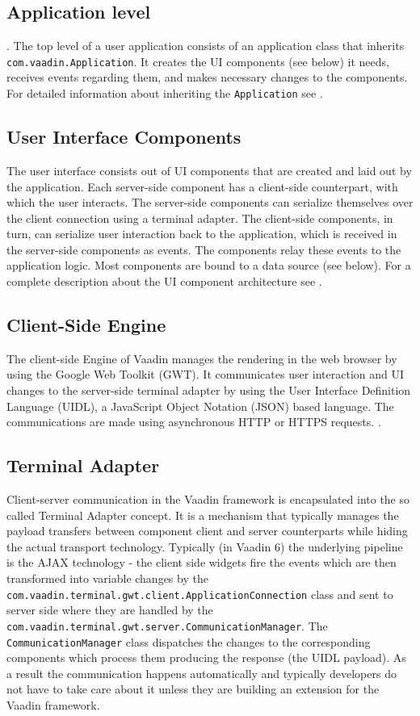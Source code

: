 \subsection{Application level}.
The top level of a user application consists of an
application class that inherits \texttt{com.vaadin.Application}. It creates the
UI components (see below) it needs, receives events regarding them, and makes
necessary changes to the components.
For detailed information about inheriting the \texttt{Application} see \cite{BoV}.

\subsection{User Interface Components}
The user interface consists out of UI
components that are created and laid out by the application.
Each server-side component has a client-side counterpart, with which the user
interacts. The server-side components can serialize themselves over the client
connection using a terminal adapter. The client-side components, in turn, can
serialize user interaction back to the application, which is received in the
server-side components as events. The components relay these events to the
application logic. Most components are bound to a data source (see below). For a
complete description about the UI component architecture see \cite{BoV}.

\subsection{Client-Side Engine} The client-side Engine of Vaadin manages the
rendering in the web browser by using the Google Web Toolkit (GWT). It
communicates user interaction and UI changes to the server-side terminal adapter
by using the User Interface Definition Language (UIDL), a JavaScript Object
Notation (JSON) based language. The communications are made using asynchronous
HTTP or HTTPS requests.
\cite{BoV}.

\subsection{Terminal Adapter} Client-server communication in the Vaadin framework
is encapsulated into the so called Terminal Adapter concept. It is a mechanism
that typically manages the payload transfers between component client and server
counterparts while hiding the actual transport technology. Typically (in Vaadin
6) the underlying pipeline is the AJAX technology - the client side widgets fire
the events which are then transformed into variable changes by the
\texttt{com.vaadin.terminal.gwt.client.ApplicationConnection} class and sent to
server side where they are handled by the
\texttt{com.vaadin.terminal.gwt.server.CommunicationManager}. The
\texttt{CommunicationManager} class dispatches the changes to the corresponding
components which process them producing the response (the UIDL payload). As a
result the communication happens automatically and typically developers do not
have to take care about it unless they are building an extension for the Vaadin
framework.

